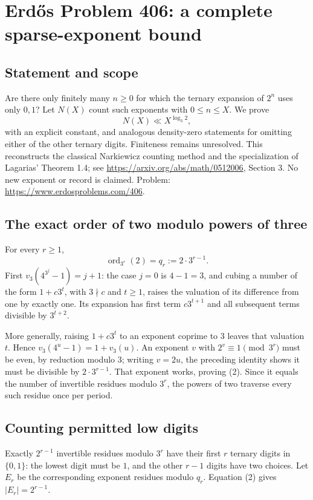 \section*{Erd\H{o}s Problem 406: a complete sparse-exponent bound}
\subsection*{Statement and scope}
Are there only finitely many $n\ge0$ for which the ternary expansion of $2^n$ uses only $0,1$? Let $N(X)$ count such exponents with $0\le n\le X$. We prove
\[
 N(X)\ll X^{\log_3 2}, \tag{1}
\]
with an explicit constant, and analogous density-zero statements for omitting either of the other ternary digits. Finiteness remains unresolved. This reconstructs the classical Narkiewicz counting method and the specialization of Lagarias' Theorem 1.4; see \url{https://arxiv.org/abs/math/0512006}, Section 3. No new exponent or record is claimed. Problem: \url{https://www.erdosproblems.com/406}.

\subsection*{The exact order of two modulo powers of three}
For every $r\ge1$,
\[
 \operatorname{ord}_{3^r}(2)=q_r:=2\cdot3^{r-1}. \tag{2}
\]
First $v_3(4^{3^j}-1)=j+1$: the case $j=0$ is $4-1=3$, and cubing a number of the form $1+c3^t$, with $3\nmid c$ and $t\ge1$, raises the valuation of its difference from one by exactly one. Its expansion has first term $c3^{t+1}$ and all subsequent terms divisible by $3^{t+2}$.

More generally, raising $1+c3^t$ to an exponent coprime to $3$ leaves that valuation $t$. Hence $v_3(4^u-1)=1+v_3(u)$. An exponent $v$ with $2^v\equiv1\pmod{3^r}$ must be even, by reduction modulo $3$; writing $v=2u$, the preceding identity shows it must be divisible by $2\cdot3^{r-1}$. That exponent works, proving (2). Since it equals the number of invertible residues modulo $3^r$, the powers of two traverse every such residue once per period.

\subsection*{Counting permitted low digits}
Exactly $2^{r-1}$ invertible residues modulo $3^r$ have their first $r$ ternary digits in $\{0,1\}$: the lowest digit must be $1$, and the other $r-1$ digits have two choices. Let $E_r$ be the corresponding exponent residues modulo $q_r$. Equation (2) gives $|E_r|=2^{r-1}$.

